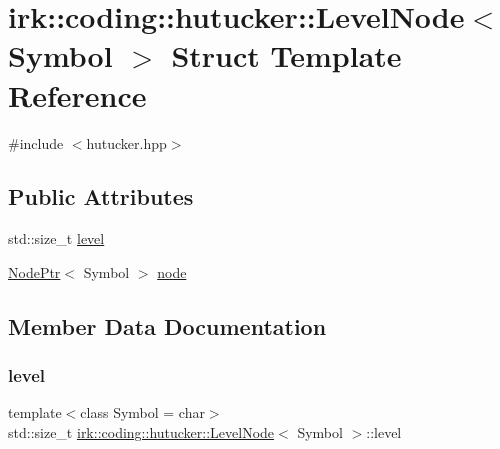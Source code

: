 \hypertarget{structirk_1_1coding_1_1hutucker_1_1LevelNode}{}\section{irk\+:\+:coding\+:\+:hutucker\+:\+:Level\+Node$<$ Symbol $>$ Struct Template Reference}
\label{structirk_1_1coding_1_1hutucker_1_1LevelNode}


{\ttfamily \#include $<$hutucker.\+hpp$>$}

\subsection*{Public Attributes}
\begin{DoxyCompactItemize}
\item 
std\+::size\+\_\+t \mbox{\hyperlink{structirk_1_1coding_1_1hutucker_1_1LevelNode_a53279d1f731151c1f3dfcac9cb9a938b}{level}}
\item 
\mbox{\hyperlink{namespaceirk_1_1coding_1_1hutucker_a4faf15998757218857b5b24845cbedb7}{Node\+Ptr}}$<$ Symbol $>$ \mbox{\hyperlink{structirk_1_1coding_1_1hutucker_1_1LevelNode_aea7b40b892b532512dd6abb21ee785b7}{node}}
\end{DoxyCompactItemize}


\subsection{Member Data Documentation}
\mbox{\label{structirk_1_1coding_1_1hutucker_1_1LevelNode_a53279d1f731151c1f3dfcac9cb9a938b}} 
\subsubsection{\texorpdfstring{level}{level}}
{\footnotesize\ttfamily template$<$class Symbol = char$>$ \\
std\+::size\+\_\+t \mbox{\hyperlink{structirk_1_1coding_1_1hutucker_1_1LevelNode}{irk\+::coding\+::hutucker\+::\+Level\+Node}}$<$ Symbol $>$\+::level}

\mbox{\label{structirk_1_1coding_1_1hutucker_1_1LevelNode_aea7b40b892b532512dd6abb21ee785b7}} 
